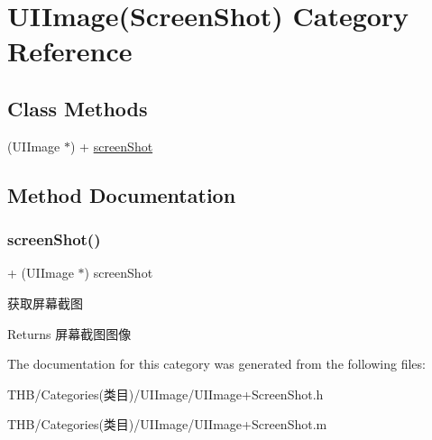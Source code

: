 \hypertarget{category_u_i_image_07_screen_shot_08}{}\section{U\+I\+Image(Screen\+Shot) Category Reference}
\label{category_u_i_image_07_screen_shot_08}
\subsection*{Class Methods}
\begin{DoxyCompactItemize}
\item 
(U\+I\+Image $\ast$) + \mbox{\hyperlink{category_u_i_image_07_screen_shot_08_a497f1e9fb0fd125840341b6a39591d83}{screen\+Shot}}
\end{DoxyCompactItemize}


\subsection{Method Documentation}
\mbox{\label{category_u_i_image_07_screen_shot_08_a497f1e9fb0fd125840341b6a39591d83}} 
\subsubsection{\texorpdfstring{screen\+Shot()}{screenShot()}}
{\footnotesize\ttfamily + (U\+I\+Image $\ast$) screen\+Shot \begin{DoxyParamCaption}{ }\end{DoxyParamCaption}}

获取屏幕截图

\begin{DoxyReturn}{Returns}
屏幕截图图像 
\end{DoxyReturn}


The documentation for this category was generated from the following files\+:\begin{DoxyCompactItemize}
\item 
T\+H\+B/\+Categories(类目)/\+U\+I\+Image/U\+I\+Image+\+Screen\+Shot.\+h\item 
T\+H\+B/\+Categories(类目)/\+U\+I\+Image/U\+I\+Image+\+Screen\+Shot.\+m\end{DoxyCompactItemize}
